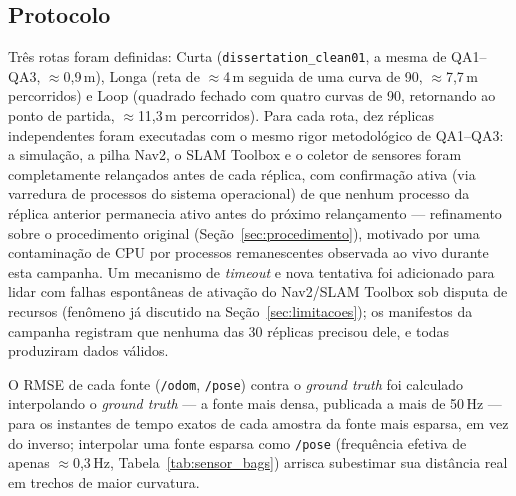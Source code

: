 \subsection{Protocolo}

Três rotas foram definidas: Curta (\texttt{dissertation\_\allowbreak clean01},
a mesma de QA1--QA3, $\approx$0,9\,m), Longa (reta de $\approx$4\,m seguida
de uma curva de 90\textdegree, $\approx$7,7\,m percorridos) e Loop (quadrado
fechado com quatro curvas de 90\textdegree, retornando ao ponto de partida,
$\approx$11,3\,m percorridos). Para cada rota, dez réplicas independentes
foram executadas com o mesmo rigor metodológico de QA1--QA3: a simulação, a
pilha Nav2, o SLAM Toolbox e o coletor de sensores foram completamente
relançados antes de cada réplica, com confirmação ativa (via varredura de
processos do sistema operacional) de que nenhum processo da réplica
anterior permanecia ativo antes do próximo relançamento --- refinamento sobre
o procedimento original (Seção~\ref{sec:procedimento}), motivado por uma
contaminação de CPU por processos remanescentes observada ao vivo durante
esta campanha. Um mecanismo de \textit{timeout} e nova tentativa foi
adicionado para lidar com falhas espontâneas de ativação do Nav2/SLAM
Toolbox sob disputa de recursos (fenômeno já discutido na
Seção~\ref{sec:limitacoes}); os manifestos da campanha registram que
nenhuma das 30 réplicas precisou dele, e todas produziram dados válidos.

O RMSE de cada fonte (\texttt{/\allowbreak odom}, \texttt{/\allowbreak pose})
contra o \textit{ground truth} \cite{sturm2012} foi calculado interpolando o
\textit{ground truth} --- a fonte mais densa, publicada a mais de 50\,Hz ---
para os instantes de tempo exatos de cada amostra da fonte mais esparsa, em
vez do inverso; interpolar uma fonte esparsa como \texttt{/\allowbreak pose}
(frequência efetiva de apenas $\approx$0,3\,Hz, Tabela~\ref{tab:sensor_bags})
arrisca subestimar sua distância real em trechos de maior curvatura.


